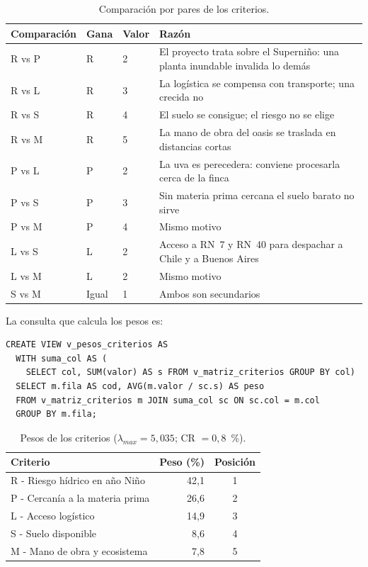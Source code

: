\documentclass[runningheads]{llncs}
\begin{document}
\begin{table}[H]
\centering
\small
\caption{Comparación por pares de los criterios.}\label{tab:compcrit}
\begin{tabular}{|p{1.9cm}|p{1cm}|p{0.8cm}|p{6.7cm}|}
\hline
Comparación & Gana & Valor & Razón\\
\hline
R vs P & R & 2 & El proyecto trata sobre el Superniño: una planta inundable invalida lo demás\\
R vs L & R & 3 & La logística se compensa con transporte; una crecida no\\
R vs S & R & 4 & El suelo se consigue; el riesgo no se elige\\
R vs M & R & 5 & La mano de obra del oasis se traslada en distancias cortas\\
P vs L & P & 2 & La uva es perecedera: conviene procesarla cerca de la finca\\
P vs S & P & 3 & Sin materia prima cercana el suelo barato no sirve\\
P vs M & P & 4 & Mismo motivo\\
L vs S & L & 2 & Acceso a RN~7 y RN~40 para despachar a Chile y a Buenos Aires\\
L vs M & L & 2 & Mismo motivo\\
S vs M & Igual & 1 & Ambos son secundarios\\
\hline
\end{tabular}
\end{table}

La consulta que calcula los pesos es:
\begin{lstlisting}
CREATE VIEW v_pesos_criterios AS
  WITH suma_col AS (
    SELECT col, SUM(valor) AS s FROM v_matriz_criterios GROUP BY col)
  SELECT m.fila AS cod, AVG(m.valor / sc.s) AS peso
  FROM v_matriz_criterios m JOIN suma_col sc ON sc.col = m.col
  GROUP BY m.fila;
\end{lstlisting}

\begin{table}[H]
\centering
\small
\caption{Pesos de los criterios ($\lambda_{max}=5,035$; CR $=0,8$~\%).}\label{tab:pesos}
\begin{tabular}{lrc}
\toprule
Criterio & Peso (\%) & Posición\\
\midrule
R - Riesgo hídrico en año Niño & 42,1 & 1\\
P - Cercanía a la materia prima & 26,6 & 2\\
L - Acceso logístico & 14,9 & 3\\
S - Suelo disponible & 8,6 & 4\\
M - Mano de obra y ecosistema & 7,8 & 5\\
\bottomrule
\end{tabular}
\end{table}
\end{document}

